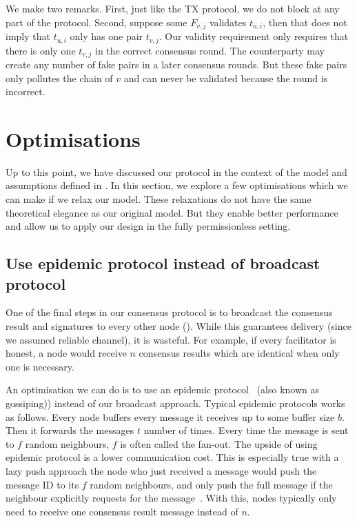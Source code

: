 We make two remarks.
First, just like the TX protocol, we do not block at any part of the protocol.
Second, suppose some $F_{v, j}$ validates $t_{u, i}$, then that does not imply that $t_{u, i}$ only has one pair $t_{v, j}$.
Our validity requirement only requires that there is only one $t_{v, j}$ in the correct consensus round.
The counterparty may create any number of fake pairs in a later consensus rounds.
But these fake pairs only pollutes the chain of $v$ and can never be validated because the round is incorrect.

\section{Optimisations}
\label{sec:optimisations}

Up to this point,
we have discussed our protocol in the context of the model and assumptions defined in .
In this section, 
we explore a few optimisations which we can make if we relax our model.
These relaxations do not have the same theoretical elegance as our original model.
But they enable better performance and allow us to apply our design in the fully permissionless setting.

\subsection{Use epidemic protocol instead of broadcast protocol}
One of the final steps in our consensus protocol is to broadcast the consensus result and signatures to every other node ().
While this guarantees delivery (since we assumed reliable channel), it is wasteful.
For example, if every facilitator is honest, a node would receive $n$ consensus results which are identical when only one is necessary.

An optimisation we can do is to use an epidemic protocol~\cite{eugster2004epidemic} (also known as gossiping)) instead of our broadcast approach.
Typical epidemic protocols works as follows.
Every node buffers every message it receives up to some buffer size $b$.
Then it forwards the messages $t$ number of times.
Every time the message is sent to $f$ random neighbours, $f$ is often called the fan-out.
The upside of using epidemic protocol is a lower communication cost.
This is especially true with a lazy push approach the node who just received a message would push the message ID to its $f$ random neighbours,
and only push the full message if the neighbour explicitly requests for the message~\cite{leitao2007epidemic}.
With this, nodes typically only need to receive one consensus result message instead of $n$.

